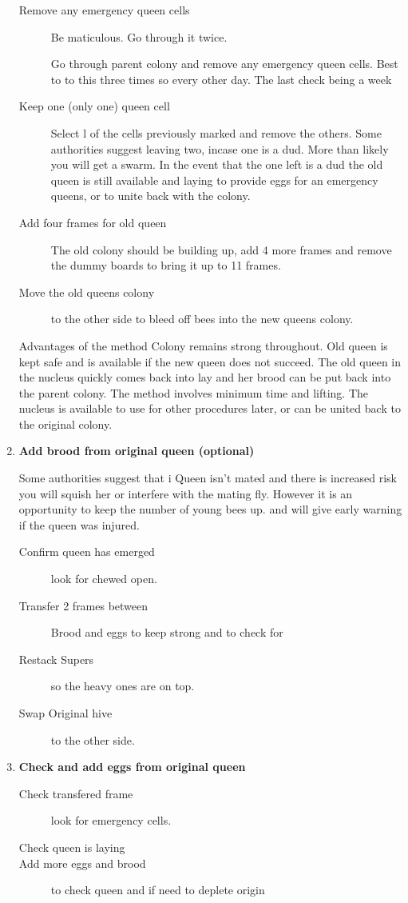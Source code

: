 \begin{enumerate}
\begin{description}
  \item[Remove any emergency queen cells] Be maticulous.  Go through it twice.
  
  
Go through parent colony and remove any emergency queen cells.  Best to to this three times so every other day.  The last check being a week

  \item[Keep one (only one) queen cell]
Select l of the cells previously marked and remove the others.
Some authorities suggest leaving two, incase one is a dud.
More than likely you will get a swarm.
In the event that the one left is a dud the old queen is still available and laying to provide eggs for an emergency queens,
or to unite back with the colony.

  \item[Add four frames for old queen] The old colony should be building up, add 4 more frames and remove the dummy boards to bring it up to 11 frames.
  \item[Move the old queens colony] to the other side to bleed off bees into the new queens colony.
\end{description}

Advantages of the method
Colony remains strong throughout.
Old queen is kept safe and is available if the new queen does not succeed.
The old queen in the nucleus quickly comes back into lay and her brood can be put back into the parent colony.
The method involves minimum time and lifting.
The nucleus is available to use for other procedures later, or can be united back to the original colony.

\item \textbf{Add brood from original queen (optional)}

Some authorities suggest that i
Queen isn't mated and there is increased risk you will squish her or interfere with the mating fly.
However it is an opportunity to keep the number of young bees up.
and will give early warning if the queen was injured.

\begin{description}
  \item[Confirm queen has emerged] look for chewed open.
  \item[Transfer 2 frames between] Brood and eggs to keep strong and to check for
  \item[Restack Supers] so the heavy ones are on top.
  \item[Swap Original hive] to the other side.
\end{description}

\item \textbf{Check and add eggs from original queen}

\begin{description}
  \item[Check transfered frame] look for emergency cells.
  \item[Check queen is laying] 
  \item[Add more eggs and brood] to check queen and if need to deplete origin
\end{description}



\end{enumerate}




